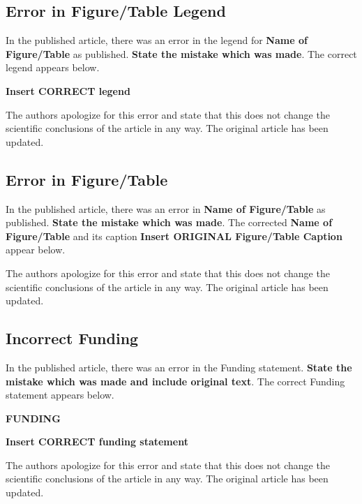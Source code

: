 \documentclass[utf8]{frontiers_correction}
\begin{document}
\vspace{5mm}
\subsection*{Error in Figure/Table Legend}
In the published article, there was an error in the legend for \textbf{Name of Figure/Table} as published. \textbf{State the mistake which was made}. The correct legend appears below.\par
\textbf{Insert CORRECT legend}\par
The authors apologize for this error and state that this does not change the scientific conclusions of the article in any way. The original article has been updated.


\vspace{5mm}
\subsection*{Error in Figure/Table}
In the published article, there was an error in \textbf{Name of Figure/Table} as published. \textbf{State the mistake which was made}. The corrected \textbf{Name of Figure/Table} and its caption \textbf{Insert ORIGINAL Figure/Table Caption} appear below.\par The authors apologize for this error and state that this does not change the scientific conclusions of the article in any way. The original article has been updated.


\vspace{5mm}
\subsection*{Incorrect Funding}
In the published article, there was an error in the Funding statement. \textbf{State the mistake which was made and include original text}. The correct Funding statement appears below.\par
\textbf{FUNDING}\par
\textbf{Insert CORRECT funding statement}\par
The authors apologize for this error and state that this does not change the scientific conclusions of the article in any way. The original article has been updated.
\end{document}
